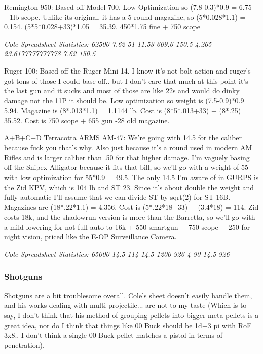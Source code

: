 \begin{multicols*}{2}
	Remington 950: Based off Model 700.  Low Optimization so (7.8-0.3)*0.9 = 6.75 +1lb scope.   Unlike its original, it has a 5 round magazine, so (5*0.028*1.1) = 0.154. (5*5*0.028+33)*1.05 = 35.39. 450*1.75 fine + 750 scope 
	
	\textit{\textcolor{OliveGreen}{Cole Spreadsheet Statistics: 62500 7.62 51 11.53 609.6 150.5 4.265 23.6177777777778 7.62 150.5}}
	
	Ruger 100: Based off the Ruger Mini-14. I know it's not bolt action and ruger's got tons of those I could base off.. but I don't care that much at this point it's the last gun and it sucks and most of those are like 22s and would do dinky damage not the 11P it should be. Low optimization so weight is (7.5-0.9)*0.9 = 5.94. Magazine is (8*.013*1.1) = 1.1144 lb. Cost is (8*5*.013+33) + (8*.25) = 35.52. Cost is 750 scope + 655 gun -28 old magazine.
	
	A+B+C+D
	Terracotta ARMS AM-47:  We're going with 14.5 for the caliber because fuck you that's why. Also just because it's a round used in modern AM Rifles and is larger caliber than .50 for that higher damage. I'm vaguely basing off the Snipex Alligator because it fits that bill, so we'll go with a weight of 55 with low optimization for 55*0.9 = 49.5. The only 14.5 I'm aware of in GURPS is the Zid KPV, which is 104 lb and ST 23.  Since it's about double the weight and fully automatic I'll assume that we can divide ST by sqrt(2)  for ST 16B. Magazines are (18*.22*1.1) =  4.356. Cost is (5*.22*18+33) + (3.4*18) = 114. Zid costs 18k,  and the shadowrun version is more than the Barretta, so we'll go with a mild lowering for not full auto to 16k + 550 smartgun + 750 scope + 250 for night vision, priced like the E-OP Surveillance Camera.
	
	\textit{\textcolor{OliveGreen}{Cole Spreadsheet Statistics: 65000 14.5 114 14.5 1200 926 4 90 14.5 926}}
	
	
	\subsubsection{Shotguns}
	
	Shotguns are a bit troublesome overall. Cole's sheet doesn't easily handle them, and his works dealing with multi-projectile... are not to my taste (Which is to say, I don't think that his method of grouping pellets into bigger meta-pellets is a great idea, nor do I think that things like 00 Buck should be 1d+3 pi with RoF 3x8.. I don't think a single 00 Buck pellet matches a pistol in terms of penetration). 
	

\end{multicols*}
